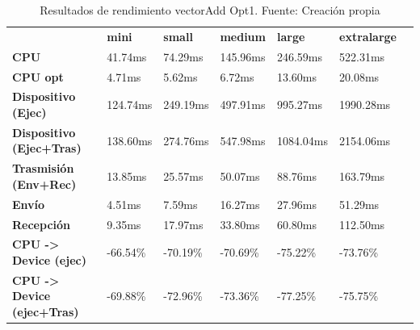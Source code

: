 \begin{table}[H]
    \centering
    \begin{tabular}{lllllll}
    \rowcolor[HTML]{DAE8FC} \ &  \textbf{mini} &  \textbf{small} &  \textbf{medium} &  \textbf{	large} &  \textbf{	extralarge} \\
    \cellcolor[HTML]{DAE8FC} \textbf{CPU} & 41.74ms & 74.29ms & 145.96ms & 	246.59ms & 	522.31ms \\
    \rowcolor[HTML]{EFEFEF} \cellcolor[HTML]{DAE8FC} \textbf{CPU opt} & 4.71ms & 5.62ms & 6.72ms & 	13.60ms & 	20.08ms \\
    \cellcolor[HTML]{DAE8FC} \textbf{Dispositivo (Ejec)} & 124.74ms & 249.19ms & 497.91ms & 	995.27ms & 	1990.28ms \\
    \rowcolor[HTML]{EFEFEF} \cellcolor[HTML]{DAE8FC} \textbf{Dispositivo (Ejec+Tras)} & 138.60ms & 274.76ms & 547.98ms & 	1084.04ms & 	2154.06ms \\
    \cellcolor[HTML]{DAE8FC} \textbf{Trasmisión (Env+Rec)} & 13.85ms & 25.57ms & 50.07ms & 	88.76ms & 	163.79ms \\
    \rowcolor[HTML]{EFEFEF} \cellcolor[HTML]{DAE8FC} \textbf{Envío} & 4.51ms & 7.59ms & 16.27ms & 	27.96ms & 	51.29ms \\
    \cellcolor[HTML]{DAE8FC} \textbf{Recepción} & 9.35ms & 17.97ms & 33.80ms & 	60.80ms & 	112.50ms \\
    \rowcolor[HTML]{EFEFEF} \cellcolor[HTML]{DAE8FC} \textbf{CPU -> Device (ejec)} & -66.54\% & -70.19\% & -70.69\% & 	-75.22\% & 	-73.76\% \\
    \cellcolor[HTML]{DAE8FC} \textbf{CPU -> Device (ejec+Tras)} & -69.88\% & -72.96\% & -73.36\% & 	-77.25\% & 	-75.75\% \\
    \end{tabular}
    \caption[Resultados de rendimiento vectorAdd Opt1]{{Resultados de rendimiento vectorAdd Opt1. Fuente: Creación propia}}
    \label{table_test_vectorAdd_Opt1_hw_performanceResults}
\end{table}